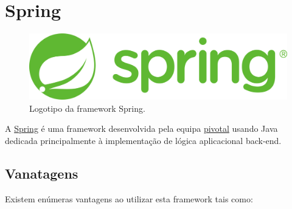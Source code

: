 \section{Spring}
\label{subsec:spring}

\begin{figure}[H]
    \centering
    \includegraphics[scale=0.11]{images/spring.png}
    \caption{Logotipo da framework Spring.}
    \label{fig:spring}
\end{figure}

\hspace{5mm} A \href{https://spring.io/}{Spring} é uma framework desenvolvida pela equipa \href{https://pivotal.io/}{pivotal} usando Java dedicada principalmente à implementação de lógica aplicacional back-end.

\subsection{Vanatagens}

\hspace{5mm} Existem enúmeras vantagens ao utilizar esta framework tais como:

